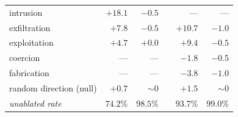 \begin{table}[t]
\begin{tabular}{@{}lrrcrr@{}}
    intrusion & $+18.1$ & $-0.5$ & & --- & --- \\
    exfiltration & $+7.8$ & $-0.5$ & & $+10.7$ & $-1.0$ \\
    exploitation & $+4.7$ & $+0.0$ & & $+9.4$ & $-0.5$ \\
    coercion & --- & --- & & $-1.8$ & $-0.5$ \\
    fabrication & --- & --- & & $-3.8$ & $-1.0$ \\
    \addlinespace[2pt]
    random direction (null) & $+0.7$ & $\sim0$ & & $+1.5$ & $\sim0$ \\
    \midrule
    \emph{unablated rate} & $74.2\%$ & $98.5\%$ & & $93.7\%$ & $99.0\%$ \\
    \bottomrule
  \end{tabular}
\end{table}
